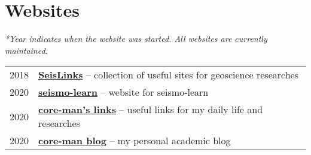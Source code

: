 \section*{Websites}

\textit{*Year indicates when the website was started. All websites are currently maintained.}

\begin{tabular}{p{} p{}}
2018 &	\textbf{\href{https://link.seisman.info/}{SeisLinks}} -- collection of useful sites for geoscience researches \\
2020 &	\textbf{\href{https://seismo-learn.org/}{seismo-learn}} -- website for seismo-learn \\
2020 &	\textbf{\href{https://core-man.github.io/link/}{core-man's links}} -- useful links for my daily life and researches \\
2020 &	\textbf{\href{https://core-man.github.io/blog/}{core-man blog}} -- my personal academic blog \\
\end{tabular}
